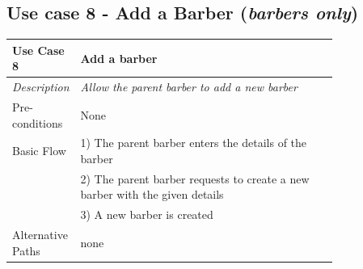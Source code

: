 \documentclass[12pt]{article}
\begin{document}
	\subsection{Use case 8 - Add a Barber (\emph{barbers only})}
	\label{chap:use-cases-8}
	\begin{table}[H]
		\begin{tabular}{|l|p{0.8\linewidth}}
			\hline
			\rowcolor[HTML]{EFEFEF} 
			\textbf{Use Case 8}  & \textbf{Add a barber}                                                       \\ \hline
			\rowcolor[HTML]{F5FBFF} 
			\textit{Description} & \textit{Allow the parent barber to add a new barber}                        \\ \hline
			\rowcolor[HTML]{EFEFEF} 
			Pre-conditions       & None                                                                        \\ \hline
			\rowcolor[HTML]{F5FBFF} 
			Basic Flow           & 1) The parent barber enters the details of the barber                       \\
			\rowcolor[HTML]{F5FBFF} 
			& 2) The parent barber requests to create a new barber with the given details \\
			\rowcolor[HTML]{F5FBFF} 
			& 3) A new barber is created                                                  \\ \hline
			\rowcolor[HTML]{EFEFEF} 
			Alternative Paths    & none                                                                       
		\end{tabular}
	\end{table}
	
\end{document}
